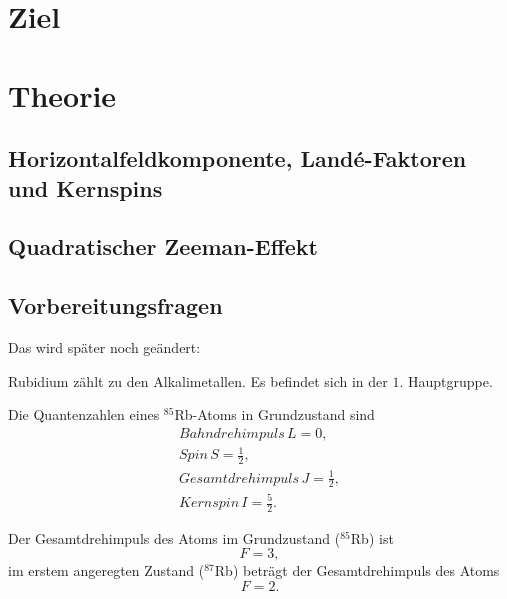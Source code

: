 \section{Ziel}


\section{Theorie}
\label{sec:Theorie}

\subsection{Horizontalfeldkomponente, Landé-Faktoren und Kernspins}

\subsection{Quadratischer Zeeman-Effekt}

\subsection{Vorbereitungsfragen}
Das wird später noch geändert:

Rubidium zählt zu den Alkalimetallen. Es befindet sich in der $\num{1}$. Hauptgruppe. 

Die Quantenzahlen eines $^{85}$Rb-Atoms in Grundzustand sind
\begin{align*}
    Bahndrehimpuls \, L = \num{0}, \\
    Spin \, S = \frac{1}{2}, \\
    Gesamtdrehimpuls \, J = \frac{1}{2}, \\
    Kernspin \, I = \frac{5}{2}. %
\end{align*}

Der Gesamtdrehimpuls des Atoms im Grundzustand ($^{85}$Rb) ist
\begin{equation*}
    F = \num{3},
\end{equation*}
im erstem angeregten Zustand ($^{87}$Rb) beträgt der Gesamtdrehimpuls des Atoms %
\begin{equation*}
    F = \num{2}.
\end{equation*} %

